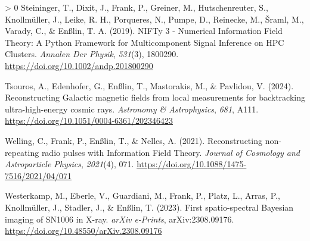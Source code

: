 \documentclass[10pt,a4paper,onecolumn]{article}
\newlength{\cslhangindent}
\newenvironment{CSLReferences}[3] %
 {%
  \setlength{\parindent}{0pt}
  \ifodd #1 \everypar{\setlength{\hangindent}{\cslhangindent}}\ignorespaces\fi
  \ifnum #2 > 0
  \setlength{\parskip}{#2\baselineskip}
  \fi
 }%
 {}
\begin{document}
\begin{CSLReferences}{1}{0}
\leavevmode\hypertarget{ref-Steiniger2017}{}%
Steininger, T., Dixit, J., Frank, P., Greiner, M., Hutschenreuter, S.,
Knollmüller, J., Leike, R. H., Porqueres, N., Pumpe, D., Reinecke, M.,
Šraml, M., Varady, C., \& Enßlin, T. A. (2019). {NIFTy 3 - Numerical
Information Field Theory: A Python Framework for Multicomponent Signal
Inference on HPC Clusters}. \emph{Annalen Der Physik}, \emph{531}(3),
1800290. \url{https://doi.org/10.1002/andp.201800290}

\leavevmode\hypertarget{ref-Tsouros2023}{}%
Tsouros, A., Edenhofer, G., Enßlin, T., Mastorakis, M., \& Pavlidou, V.
(2024). {Reconstructing Galactic magnetic fields from local measurements
for backtracking ultra-high-energy cosmic rays}. \emph{Astronomy \&
Astrophysics}, \emph{681}, A111.
\url{https://doi.org/10.1051/0004-6361/202346423}

\leavevmode\hypertarget{ref-Welling2021}{}%
Welling, C., Frank, P., Enßlin, T., \& Nelles, A. (2021).
{Reconstructing non-repeating radio pulses with Information Field
Theory}. \emph{Journal of Cosmology and Astroparticle Physics},
\emph{2021}(4), 071. \url{https://doi.org/10.1088/1475-7516/2021/04/071}

\leavevmode\hypertarget{ref-Westerkamp2023}{}%
Westerkamp, M., Eberle, V., Guardiani, M., Frank, P., Platz, L., Arras,
P., Knollmüller, J., Stadler, J., \& Enßlin, T. (2023). {First
spatio-spectral Bayesian imaging of SN1006 in X-ray}. \emph{arXiv
e-Prints}, arXiv:2308.09176.
\url{https://doi.org/10.48550/arXiv.2308.09176}

\end{CSLReferences}
\end{document}
